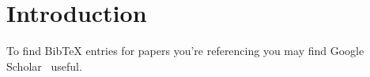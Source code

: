 \section{Introduction}
\label{sec:introduction}

To find BibTeX entries for papers you're referencing you may find
  Google Scholar~\cite{googlescholar} useful.
